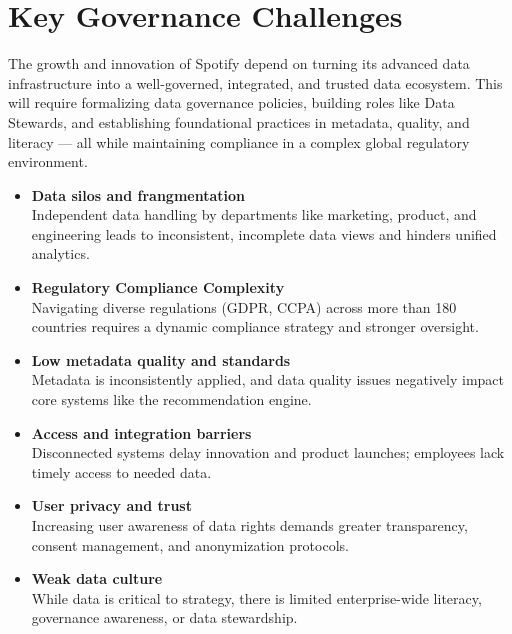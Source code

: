 \documentclass[11pt,a4paper,computermodern]{article}
\begin{document}
\section*{Key Governance Challenges}

The growth and innovation of Spotify depend on turning its advanced data infrastructure into a well-governed, integrated, and trusted data ecosystem. This will require formalizing data governance policies, building roles like Data Stewards, and establishing foundational practices in metadata, quality, and literacy — all while maintaining compliance in a complex global regulatory environment.

\begin{itemize}[itemsep=5pt, parsep=0pt]
	\item \textbf{Data silos and frangmentation}\\
	Independent data handling by departments like marketing, product, and engineering leads to inconsistent, incomplete data views and hinders unified analytics.
	\item \textbf{Regulatory Compliance Complexity}\\
	Navigating diverse regulations (GDPR, CCPA) across more than 180 countries requires a dynamic compliance strategy and stronger oversight.
	\item \textbf{Low metadata quality and standards}\\
	Metadata is inconsistently applied, and data quality issues negatively impact core systems like the recommendation engine.
	\item \textbf{Access and integration barriers}\\
	Disconnected systems delay innovation and product launches; employees lack timely access to needed data.
	\item \textbf{User privacy and trust}\\
	Increasing user awareness of data rights demands greater transparency, consent management, and anonymization protocols.
	\item \textbf{Weak data culture}\\
	While data is critical to strategy, there is limited enterprise-wide literacy, governance awareness, or data stewardship.
\end{itemize}
\end{document}
